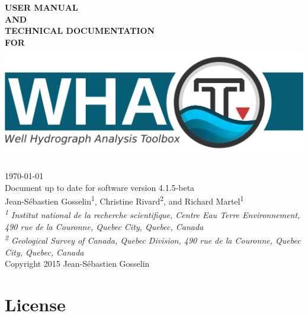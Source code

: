 \documentclass[WHATMANUAL.tex]{subfiles}
\begin{document}
\hypersetup{pageanchor=false}
\begin{titlepage}
\begin{center}


\textbf{\fontsize{30}{36}\selectfont USER MANUAL}\\[1.0cm]
\textbf{\fontsize{30}{36}\selectfont AND}\\[1.0cm]
\textbf{\fontsize{30}{36}\selectfont TECHNICAL DOCUMENTATION}\\[1.0cm]
\textbf{\fontsize{30}{36}\selectfont FOR}\\

\includegraphics[width=1\textwidth]{WHAT_banner}~\\[2cm]

{\Large \today}\\[0.5cm]
{\Large Document up to date for software version 4.1.5-beta}\\[2cm]

{\large Jean-S\'ebastien Gosselin\textsuperscript{1}, Christine Rivard\textsuperscript{2}, and Richard Martel\textsuperscript{1}}\\[0.25cm]

\textit{{\small\textsuperscript{1} Institut national de la recherche scientifique, Centre Eau Terre Environnement, 490 rue de la Couronne, Quebec City, Quebec, Canada}}\\[0.1cm]

\textit{{\small\textsuperscript{2} Geological Survey of Canada, Quebec Division, 490 rue de la Couronne, Quebec City, Quebec, Canada}}\\[2cm]

{Copyright 2015 Jean-S\'ebastien Gosselin}

\end{center}
\end{titlepage}
\hypersetup{pageanchor=true}
\chapter*{License}
\end{document}

